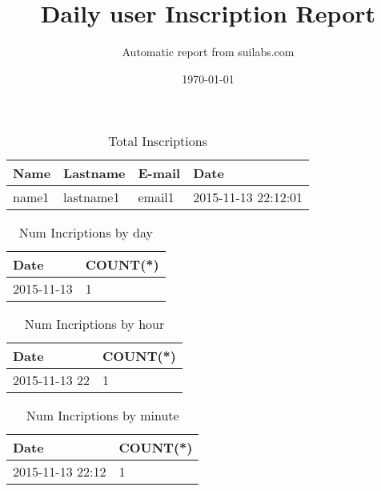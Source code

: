 \documentclass{article}
\title{Daily user Inscription Report}
\author{Automatic report from suilabs.com}
\date{\today}
\begin{document}
\maketitle
    \begin{table}[]
\centering
\caption{Total Inscriptions}
\label{lblTotal Inscriptions}
\begin{tabular}{|llll|}
\textbf{Name} &\textbf{Lastname} &\textbf{E-mail} &\textbf{Date} \\
\hline 
name1 & lastname1 & email1 & 2015-11-13 22:12:01 \\
\end{tabular}
\end{table}

\begin{table}[]
\centering
\caption{Num Incriptions by day}
\label{lblNum Incriptions by day}
\begin{tabular}{|ll|}
\textbf{Date} &\textbf{COUNT(*)} \\
\hline 
2015-11-13 & 1 \\
\end{tabular}
\end{table}

\begin{table}[]
\centering
\caption{Num Incriptions by hour}
\label{lblNum Incriptions by hour}
\begin{tabular}{|ll|}
\textbf{Date} &\textbf{COUNT(*)} \\
\hline 
2015-11-13 22 & 1 \\
\end{tabular}
\end{table}

\begin{table}[]
\centering
\caption{Num Incriptions by minute}
\label{lblNum Incriptions by minute}
\begin{tabular}{|ll|}
\textbf{Date} &\textbf{COUNT(*)} \\
\hline 
2015-11-13 22:12 & 1 \\
\end{tabular}
\end{table}
\end{document}
